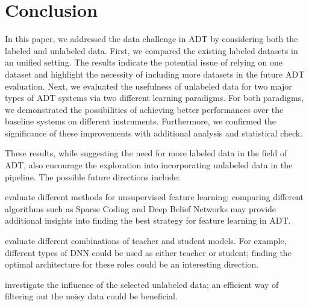 \documentclass{article}
\begin{document}
\section{Conclusion}
\label{sec:conc}

In this paper, we addressed the data challenge in ADT by considering both the labeled and unlabeled data. First, we compared the existing labeled datasets in an unified setting. The results indicate the potential issue of relying on one dataset and highlight the necessity of including more datasets in the future ADT evaluation. Next, we evaluated the usefulness of unlabeled data for two major types of ADT systems via two different learning paradigms. For both paradigms, we demonstrated the possibilities of achieving better performances over the baseline systems on different instruments. Furthermore, we confirmed the significance of these improvements with additional analysis and statistical check. 

These results, while suggesting the need for more labeled data in the field of ADT, also encourage the exploration into incorporating unlabeled data in the pipeline. 
The possible future directions include:
\begin{inparaenum}[(i)]
	\item evaluate different methods for unsupervised feature learning; comparing different algorithms such as Sparse Coding \cite{Raina2007a} and Deep Belief Networks \cite{Hamel2010} may provide additional insights into finding the best strategy for feature learning in ADT.
    \item evaluate different combinations of teacher and student models. For example, different types of DNN could be used as either teacher or student; finding the optimal architecture for these roles could be an interesting direction. 
    \item investigate the influence of the selected unlabeled data; an efficient way of filtering out the noisy data could be beneficial.   
\end{inparaenum} 



%
%
%
%
\end{document}
